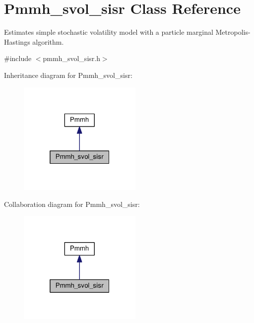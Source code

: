 \hypertarget{classPmmh__svol__sisr}{}\section{Pmmh\+\_\+svol\+\_\+sisr Class Reference}
\label{classPmmh__svol__sisr}


Estimates simple stochastic volatility model with a particle marginal Metropolis-\/\+Hastings algorithm.  




{\ttfamily \#include $<$pmmh\+\_\+svol\+\_\+sisr.\+h$>$}



Inheritance diagram for Pmmh\+\_\+svol\+\_\+sisr\+:
\nopagebreak
\begin{figure}[H]
\begin{center}
\leavevmode
\includegraphics[width=169pt]{classPmmh__svol__sisr__inherit__graph}
\end{center}
\end{figure}


Collaboration diagram for Pmmh\+\_\+svol\+\_\+sisr\+:
\nopagebreak
\begin{figure}[H]
\begin{center}
\leavevmode
\includegraphics[width=169pt]{classPmmh__svol__sisr__coll__graph}
\end{center}
\end{figure}
